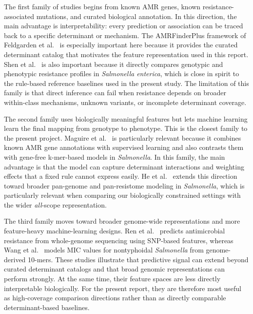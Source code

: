 The first family of studies begins from known AMR genes, known resistance-associated mutations, and curated biological annotation. In this direction, the main advantage is interpretability: every prediction or association can be traced back to a specific determinant or mechanism. The AMRFinderPlus framework of Feldgarden et al.~\citep{feldgarden2021amrfinderplus} is especially important here because it provides the curated determinant catalog that motivates the feature representation used in this report. Shen et al.~\citep{shen2024comparison} is also important because it directly compares genotypic and phenotypic resistance profiles in \textit{Salmonella enterica}, which is close in spirit to the rule-based reference baselines used in the present study. The limitation of this family is that direct inference can fail when resistance depends on broader within-class mechanisms, unknown variants, or incomplete determinant coverage.

The second family uses biologically meaningful features but lets machine learning learn the final mapping from genotype to phenotype. This is the closest family to the present project. Maguire et al.~\citep{maguire2019identification} is particularly relevant because it combines known AMR gene annotations with supervised learning and also contrasts them with gene-free k-mer-based models in \textit{Salmonella}. In this family, the main advantage is that the model can capture determinant interactions and weighting effects that a fixed rule cannot express easily. He et al.~\citep{he2025prediction} extends this direction toward broader pan-genome and pan-resistome modeling in \textit{Salmonella}, which is particularly relevant when comparing our biologically constrained settings with the wider \textit{all}-scope representation.

The third family moves toward broader genome-wide representations and more feature-heavy machine-learning designs. Ren et al.~\citep{ren2022prediction} predicts antimicrobial resistance from whole-genome sequencing using SNP-based features, whereas Wang et al.~\citep{wang2023using} models MIC values for nontyphoidal \textit{Salmonella} from genome-derived 10-mers. These studies illustrate that predictive signal can extend beyond curated determinant catalogs and that broad genomic representations can perform strongly. At the same time, their feature spaces are less directly interpretable biologically. For the present report, they are therefore most useful as high-coverage comparison directions rather than as directly comparable determinant-based baselines.

